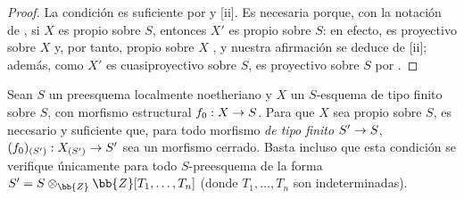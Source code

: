 \documentclass[oneside,10pt]{amsart}
\makeatletter
\newcommand{\ega@arrow}[2]{\mathchoice{#1}{#2}{#2}{#2}}
\renewcommand{\to}{\ega@arrow{\longrightarrow}{\rightarrow}}
\let\EGAOriginalLabel\label
\renewcommand{\label}[1]{\phantomsection\EGAOriginalLabel{#1}}
\makeatother
\begin{document}
\begin{proof}
La condición es suficiente por  y [ii].
Es necesaria porque, con la notación de , si $X$ es propio sobre $S$, entonces $X'$ es propio sobre $S$: en efecto, es proyectivo sobre $X$ y, por tanto, propio sobre $X$ , y nuestra afirmación se deduce de [ii]; además, como $X'$ es cuasiproyectivo sobre $S$, es proyectivo sobre $S$ por .
\end{proof}

\begin{corollary}[5.6.3]
\label{II.5.6.3}
Sean $S$ un preesquema localmente noetheriano y $X$ un $S$-esquema de tipo finito sobre $S$, con morfismo estructural $f_0:X\to S$.
Para que $X$ sea propio sobre $S$, es necesario y suficiente que, para todo morfismo \emph{de tipo finito} $S'\to S$, $(f_0)_{(S')}:X_{(S')}\to S'$ sea un morfismo cerrado.
Basta incluso que esta condición se verifique únicamente para todo $S$-preesquema de la forma $S'=S\otimes_\bb{Z}\bb{Z}[T_1,\ldots,T_n]$ (donde $T_1,\ldots,T_n$ son indeterminadas).
\end{corollary}
\end{document}
